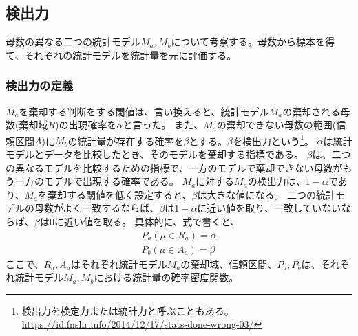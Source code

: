 \documentclass[a4paper,11pt,dvipdfmx]{jsarticle}
\begin{document}
\subsection{検出力}
母数の異なる二つの統計モデル$M_a,M_b$について考察する。母数から標本を得て、それぞれの統計モデルを統計量を元に評価する。
\subsubsection{検出力の定義}
$M_a$を棄却する判断をする閾値は、言い換えると、統計モデル$M_a$の棄却される母数(棄却域$R$)の出現確率を$\alpha$と言った。
また、$M_a$の棄却できない母数の範囲(信頼区間$A$)に$M_b$の統計量が存在する確率を$\beta$とする。$\beta$を検出力という\footnote{検出力を検定力または統計力と呼ぶこともある。\url{https://id.fnshr.info/2014/12/17/stats-done-wrong-03/}}。
$\alpha$は統計モデルとデータを比較したとき、そのモデルを棄却する指標である。
$\beta$は、二つの異なるモデルを比較するための指標で、一方のモデルで棄却できない母数がもう一方のモデルで出現する確率である。
$M_a$に対する$M_a$の検出力は、$1-\alpha$であり、$M_a$を棄却する閾値を低く設定すると、$\beta$は大きな値になる。
二つの統計モデルの母数がよく一致するならば、$\beta$は$1-\alpha$に近い値を取り、一致していないならば、$\beta$は0に近い値を取る。
具体的に、式で書くと、
\begin{eqnarray*}
    P_a(\mu \in R_a) = \alpha\\
    P_b(\mu \in A_a) = \beta
\end{eqnarray*}
ここで、$R_a,A_a$はそれぞれ統計モデル$M_a$の棄却域、信頼区間、$P_a,P_b$は、それぞれ統計モデル$M_a,M_b$における統計量の確率密度関数。
\end{document}
